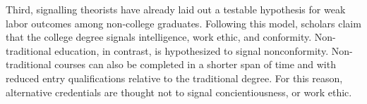 \documentclass[review]{elsarticle}
\begin{document}
Third, signalling theorists have already laid out a testable hypothesis for weak labor outcomes among non-college graduates.
Following this model, scholars claim that the college degree signals intelligence, work ethic, and conformity\cite{caplan2018case}.
Non-traditional education, in contrast, is hypothesized to signal nonconformity.
Non-traditional courses can also be completed in a shorter span of time and with reduced entry qualifications relative to the traditional degree.
For this reason, alternative credentials are thought not to signal concientiousness, or work ethic.





\end{document}
